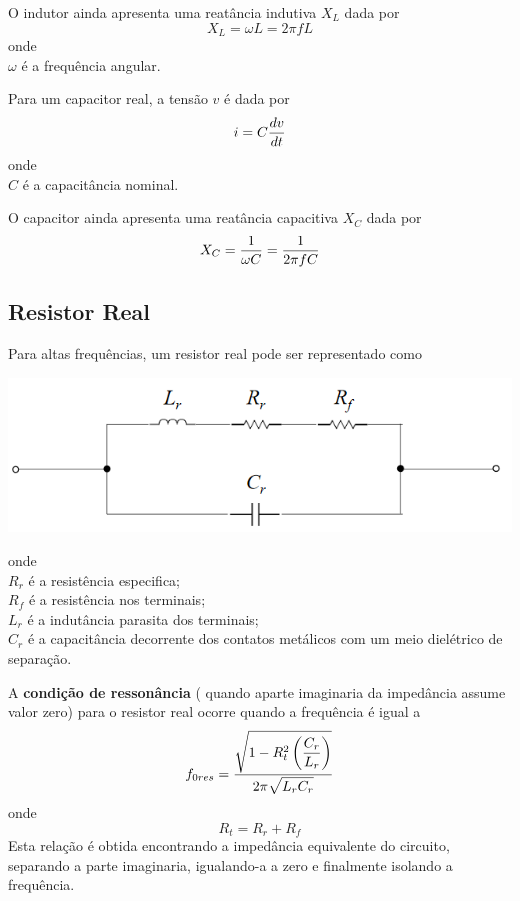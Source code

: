 O indutor ainda apresenta uma reatância indutiva $X_L$ dada por
\begin{equation}
	X_L=\omega L=2\pi fL
\end{equation}
onde\\
$\omega$ é a frequência angular.	

Para um capacitor real, a tensão $v$ é dada por
\begin{equation}
	i=C\displaystyle \frac{\displaystyle dv }{ \displaystyle dt}
\end{equation}
onde\\
$C$ é a capacitância nominal.


O capacitor ainda apresenta uma reatância capacitiva $X_C$ dada por
\begin{equation}
	X_C=\displaystyle \frac{\displaystyle 1 }{ \displaystyle \omega C}=\displaystyle \frac{\displaystyle 1 }{ \displaystyle 2\pi fC}
\end{equation}

\subsection{Resistor Real}

Para altas frequências, um resistor real pode ser representado como
\begin{center}
\includegraphics[width=\ScaleIfNeeded]{week01_ResumoResistorReal.png}
\end{center}
onde \\
$R_r$ é a resistência especifica;\\
$R_f$ é a resistência nos terminais;\\
$L_r$ é a indutância parasita dos terminais;\\
$C_r$ é a capacitância decorrente dos contatos metálicos com um meio dielétrico de separação.


A \textbf{condição de ressonância} ( quando aparte imaginaria da impedância assume valor zero) para o resistor real ocorre quando a frequência é igual a
\begin{equation}
f_{0res}=\displaystyle \frac{\displaystyle \sqrt{1-R_t^2\left(\displaystyle \frac{\displaystyle C_r }{ \displaystyle L_r}\right)} }{ \displaystyle 2\pi\sqrt{L_rC_r}}
\end{equation}
onde\\
\begin{equation}
	R_t=R_r+R_f
\end{equation}
Esta relação é obtida encontrando a impedância equivalente do circuito, separando a parte imaginaria, igualando-a a zero e finalmente isolando a frequência.


